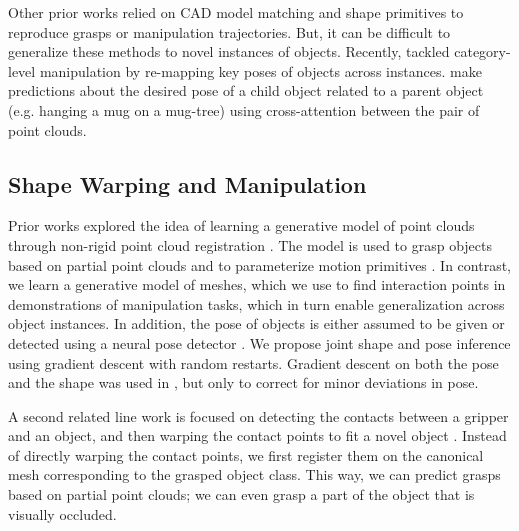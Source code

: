 \documentclass{article}
\begin{document}
Other prior works relied on CAD model matching \cite{klank09realtime,brook11collaborative,beetz11robotic,jakel12learning} and shape primitives \cite{miller03automatic} to reproduce grasps or manipulation trajectories. But, it can be difficult to generalize these methods to novel instances of objects. Recently, \citet{wen22you} tackled category-level manipulation by re-mapping key poses of objects across instances. \citet{pan22taxpose} make predictions about the desired pose of a child object related to a parent object (e.g. hanging a mug on a mug-tree) using cross-attention \cite{vaswani17attention} between the pair of point clouds.

\subsection{Shape Warping and Manipulation}

Prior works explored the idea of learning a generative model of point clouds through non-rigid point cloud registration \cite{rodriguez18transferring,rodriguez18transferringa,klamt18supervised,thompson21shapebased}. The model is used to grasp objects based on partial point clouds \cite{rodriguez18transferring,rodriguez18transferringa,klamt18supervised} and to parameterize motion primitives \cite{thompson21shapebased}. In contrast, we learn a generative model of meshes, which we use to find interaction points in demonstrations of manipulation tasks, which in turn enable generalization across object instances. In addition, the pose of objects is either assumed to be given \cite{thompson21shapebased} or detected using a neural pose detector \cite{klamt18supervised}. We propose joint shape and pose inference using gradient descent with random restarts. Gradient descent on both the pose and the shape was used in \cite{rodriguez18transferring,rodriguez18transferringa}, but only to correct for minor deviations in pose. %

A second related line work is focused on detecting the contacts between a gripper and an object, and then warping the contact points to fit a novel object \cite{li07datadriven,benamor12generalization,hillenbrand12transferring,jakel12learning,stouraitis15functional,rodriguez18learning,pavlichenko19autonomous,tian19transferring}. Instead of directly warping the contact points, we first register them on the canonical mesh corresponding to the grasped object class. This way, we can predict grasps based on partial point clouds; we can even grasp a part of the object that is visually occluded. %
\end{document}
